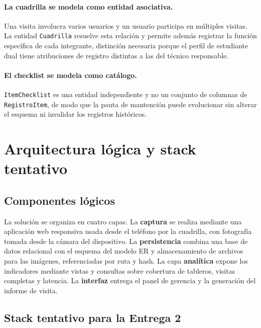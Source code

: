 \documentclass[10pt,letterpaper]{article}
\begin{document}
\paragraph{La cuadrilla se modela como entidad asociativa.} Una visita involucra
varios usuarios y un usuario participa en múltiples visitas. La entidad
\texttt{Cuadrilla} resuelve esta relación y permite además registrar la función
específica de cada integrante, distinción necesaria porque el perfil de estudiante
dual tiene atribuciones de registro distintas a las del técnico responsable.

\paragraph{El checklist se modela como catálogo.} \texttt{ItemChecklist} es una
entidad independiente y no un conjunto de columnas de \texttt{RegistroItem}, de modo
que la pauta de mantención puede evolucionar sin alterar el esquema ni invalidar los
registros históricos.

\section{Arquitectura lógica y stack tentativo}

\subsection{Componentes lógicos}

La solución se organiza en cuatro capas. La \textbf{captura} se realiza mediante una
aplicación web responsiva usada desde el teléfono por la cuadrilla, con fotografía
tomada desde la cámara del dispositivo. La \textbf{persistencia} combina una base de
datos relacional con el esquema del modelo ER y almacenamiento de archivos para las
imágenes, referenciadas por ruta y hash. La capa \textbf{analítica} expone los
indicadores mediante vistas y consultas sobre cobertura de tableros, visitas completas
y latencia. La \textbf{interfaz} entrega el panel de gerencia y la generación del
informe de visita.

\subsection{Stack tentativo para la Entrega 2}
\end{document}

